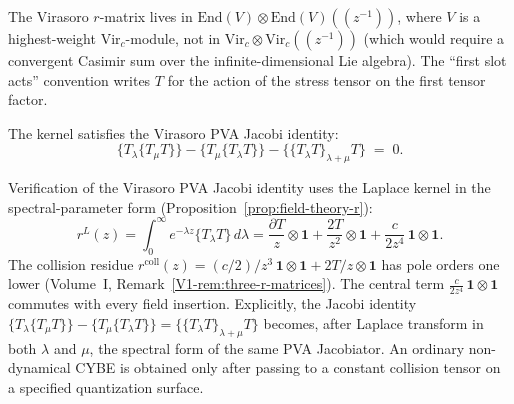 \begin{remark}
The Virasoro $r$-matrix lives in $\mathrm{End}(V) \otimes \mathrm{End}(V)((z^{-1}))$, where $V$ is a highest-weight $\mathrm{Vir}_c$-module, not in $\mathrm{Vir}_c \otimes \mathrm{Vir}_c((z^{-1}))$ (which would require a convergent Casimir sum over the infinite-dimensional Lie algebra). The ``first slot acts'' convention writes $T$ for the action of the stress tensor on the first tensor factor.
\end{remark}

The kernel satisfies the Virasoro PVA Jacobi identity:
\begin{equation}
\{T_\lambda\{T_\mu T\}\}
-\{T_\mu\{T_\lambda T\}\}
-\{\{T_\lambda T\}_{\lambda+\mu}T\}
\;=\;0.
\end{equation}

\begin{computation}
Verification of the Virasoro PVA Jacobi identity uses the Laplace kernel in the spectral-parameter form
(Proposition~\ref{prop:field-theory-r}):
\[
r^L(z)
= \int_0^\infty e^{-\lambda z} \{T_\lambda T\}\,d\lambda
= \frac{\partial T}{z} \otimes \mathbf{1}
 + \frac{2T}{z^2} \otimes \mathbf{1}
 + \frac{c}{2z^4}\,\mathbf{1}\otimes\mathbf{1}.
\]
The collision residue $r^{\mathrm{coll}}(z) = (c/2)/z^3\,
\mathbf{1}\otimes\mathbf{1} + 2T/z\otimes\mathbf{1}$ has pole
orders one lower (Volume~I, Remark~\ref{V1-rem:three-r-matrices}).
The central term $\frac{c}{2z^4}\,\mathbf{1}\otimes\mathbf{1}$
commutes with every field insertion.
Explicitly, the Jacobi identity
$\{T_\lambda\{T_\mu T\}\} - \{T_\mu\{T_\lambda T\}\}
= \{\{T_\lambda T\}_{\lambda+\mu} T\}$
becomes, after Laplace transform in both $\lambda$ and $\mu$,
the spectral form of the same PVA Jacobiator. An ordinary
non-dynamical CYBE is obtained only after passing to a constant
collision tensor on a specified quantization surface.
\end{computation}

